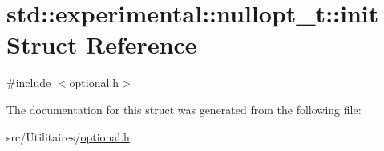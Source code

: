 \hypertarget{structstd_1_1experimental_1_1nullopt__t_1_1init}{}\section{std\+:\+:experimental\+:\+:nullopt\+\_\+t\+:\+:init Struct Reference}
\label{structstd_1_1experimental_1_1nullopt__t_1_1init}


{\ttfamily \#include $<$optional.\+h$>$}



The documentation for this struct was generated from the following file\+:\begin{DoxyCompactItemize}
\item 
src/\+Utilitaires/\mbox{\hyperlink{optional_8h}{optional.\+h}}\end{DoxyCompactItemize}
